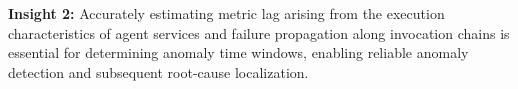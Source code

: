 
\begin{mybox}
\textbf{Insight 2:} Accurately estimating metric lag arising from the execution characteristics of agent services and failure propagation along invocation chains is essential for determining anomaly time windows, enabling reliable anomaly detection and subsequent root-cause localization.
\end{mybox}

